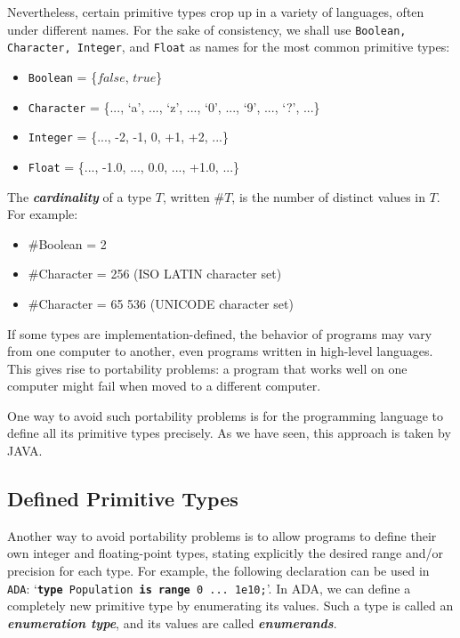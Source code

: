 \documentclass{article}
\def\bsq#1{%
\lq{#1}\rq}
\begin{document}
Nevertheless, certain primitive types crop up in a variety of languages, often under different names. For the sake of consistency, we shall use \texttt{Boolean, Character, Integer}, and \texttt{Float} as names for the most common primitive types:
\begin{itemize}
    \item \texttt{Boolean} = \{$false$, $true$\}
    \item \texttt{Character} = \{..., \bsq a, ..., \bsq z, ..., \bsq 0, ..., \bsq 9, ..., \bsq ?, ...\}
    \item \texttt{Integer} = \{..., -2, -1, 0, +1, +2, ...\}
    \item \texttt{Float} = \{..., -1.0, ..., 0.0, ..., +1.0, ...\}
\end{itemize}

The \textbf{\textit{cardinality}} of a type $T$, written \#$T$, is the number of distinct values in $T$. For example:
\begin{itemize}
    \item \#Boolean = 2
    \item \#Character = 256 (ISO LATIN character set)
    \item \#Character = 65 536 (UNICODE character set)
\end{itemize}

\newline

If some types are implementation-defined, the behavior of programs may vary from one computer to another, even programs written in high-level languages. This gives rise to portability problems: a program that works well on one computer might fail when moved to a different computer.

One way to avoid such portability problems is for the programming language to define all its primitive types precisely. As we have seen, this approach is taken by JAVA.

\subsection{Defined Primitive Types}

Another way to avoid portability problems is to allow programs to define their own integer and floating-point types, stating explicitly the desired range and/or precision for each type. For example, the following declaration can be used in \texttt{ADA}: \lq \texttt{\textbf{type} Population \textbf{is range} 0 ... 1e10;}\rq. In ADA, we can define a completely new primitive type by enumerating its
values. Such a type is called an \textbf{\textit{enumeration type}}, and its values are called \textit{\textbf{enumerands}}.
\end{document}
